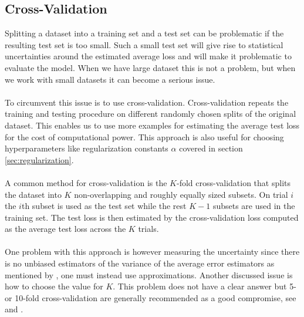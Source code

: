 \subsection{Cross-Validation} \label{sec:cv}
Splitting a dataset into a training set and a test set can be problematic if the resulting test set is too small. Such a small test set will give rise to statistical uncertainties around the estimated average loss and will make it problematic to evaluate the model. When we have large dataset this is not a problem, but when we work with small datasets it can become a serious issue. \\
\\
To circumvent this issue is to use cross-validation. Cross-validation repeats the training and testing procedure on different randomly chosen splits of the original dataset. This enables us to use more examples for estimating the average test loss for the cost of computational power. This approach is also useful for choosing hyperparameters like regularization constants $\alpha$ covered in section \ref{sec:regularization}.\\
\\
A common method for cross-validation is the $K$-fold cross-validation that splits the dataset into $K$ non-overlapping and roughly equally sized subsets. On trial $i$ the $i$th subset is used as the test set while the rest $K - 1$ subsets are used in the training set. The test loss is then estimated by the cross-validation loss computed as the average test loss across the $K$ trials.\\
\\
One problem with this approach is however measuring the uncertainty since there is no unbiased estimators of the variance of the average error estimators as mentioned by \cite{Bengio04}, one must instead use approximations. Another discussed issue is how to choose the value for $K$. This problem does not have a clear answer but 5- or 10-fold cross-validation are generally recommended as a good compromise, see \cite{brieman_spector_1992} and \cite{kohavi_1992}.

